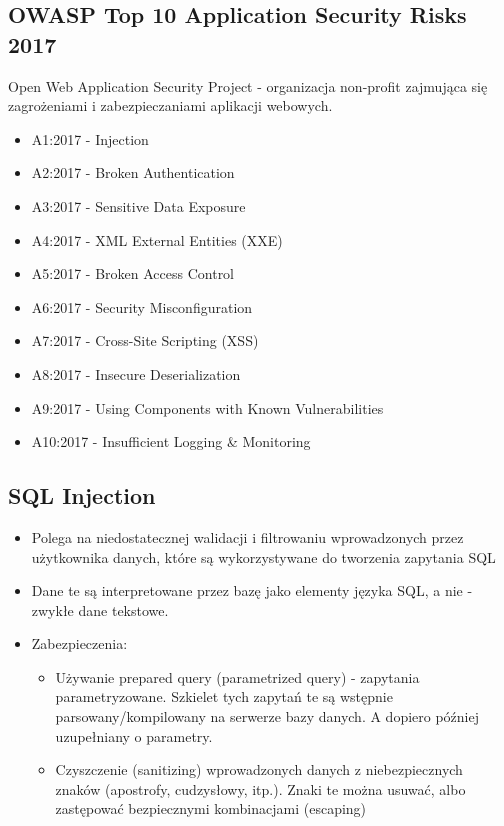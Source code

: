 \documentclass[../main.tex]{subfiles}
\begin{document}
    \subsection{OWASP Top 10 Application Security Risks 2017}
    Open Web Application Security Project - organizacja non-profit zajmująca się zagrożeniami i zabezpieczaniami aplikacji
    webowych.

    \begin{itemize}
        \item A1:2017 - Injection
        \item A2:2017 - Broken Authentication
        \item A3:2017 - Sensitive Data Exposure
        \item A4:2017 - XML External Entities (XXE)
        \item A5:2017 - Broken Access Control
        \item A6:2017 - Security Misconfiguration
        \item A7:2017 - Cross-Site Scripting (XSS)
        \item A8:2017 - Insecure Deserialization
        \item A9:2017 - Using Components with Known Vulnerabilities
        \item A10:2017 - Insufficient Logging \& Monitoring
    \end{itemize}

    \subsection{SQL Injection}
    \begin{itemize}
        \item Polega na niedostatecznej walidacji i filtrowaniu wprowadzonych przez
        użytkownika danych, które są wykorzystywane do tworzenia zapytania SQL
        \item Dane te są interpretowane przez bazę jako elementy języka SQL, a nie -
        zwykłe dane tekstowe.
        \item Zabezpieczenia:
        \begin{itemize}
            \item Używanie prepared query (parametrized query) - zapytania parametryzowane.
            Szkielet tych zapytań te są wstępnie parsowany/kompilowany na serwerze
            bazy danych. A dopiero później uzupełniany o parametry.
            \item Czyszczenie (sanitizing) wprowadzonych danych z niebezpiecznych znaków
            (apostrofy, cudzysłowy, itp.). Znaki te można usuwać, albo zastępować
            bezpiecznymi kombinacjami (escaping)
        \end{itemize}
    \end{itemize}
\end{document}
